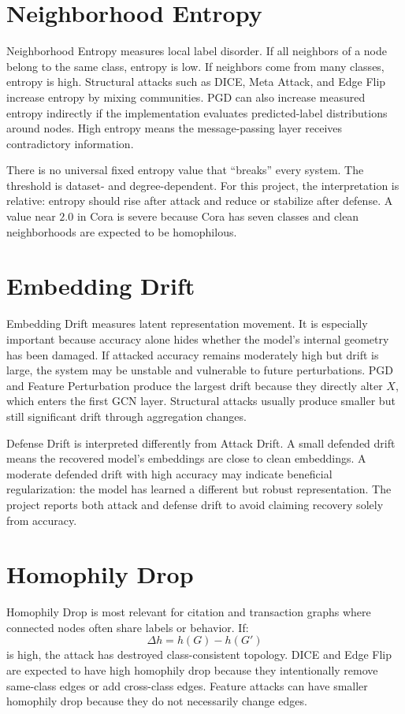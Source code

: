 \documentclass[12pt,oneside]{report}
\begin{document}
\section{Neighborhood Entropy}
Neighborhood Entropy measures local label disorder. If all neighbors of a node belong to the same class, entropy is low. If neighbors come from many classes, entropy is high. Structural attacks such as DICE, Meta Attack, and Edge Flip increase entropy by mixing communities. PGD can also increase measured entropy indirectly if the implementation evaluates predicted-label distributions around nodes. High entropy means the message-passing layer receives contradictory information.

There is no universal fixed entropy value that ``breaks'' every system. The threshold is dataset- and degree-dependent. For this project, the interpretation is relative: entropy should rise after attack and reduce or stabilize after defense. A value near $2.0$ in Cora is severe because Cora has seven classes and clean neighborhoods are expected to be homophilous.

\section{Embedding Drift}
Embedding Drift measures latent representation movement. It is especially important because accuracy alone hides whether the model's internal geometry has been damaged. If attacked accuracy remains moderately high but drift is large, the system may be unstable and vulnerable to future perturbations. PGD and Feature Perturbation produce the largest drift because they directly alter $X$, which enters the first GCN layer. Structural attacks usually produce smaller but still significant drift through aggregation changes.

Defense Drift is interpreted differently from Attack Drift. A small defended drift means the recovered model's embeddings are close to clean embeddings. A moderate defended drift with high accuracy may indicate beneficial regularization: the model has learned a different but robust representation. The project reports both attack and defense drift to avoid claiming recovery solely from accuracy.

\section{Homophily Drop}
Homophily Drop is most relevant for citation and transaction graphs where connected nodes often share labels or behavior. If:
$$
\Delta h=h(G)-h(G')
$$
is high, the attack has destroyed class-consistent topology. DICE and Edge Flip are expected to have high homophily drop because they intentionally remove same-class edges or add cross-class edges. Feature attacks can have smaller homophily drop because they do not necessarily change edges.
\end{document}
